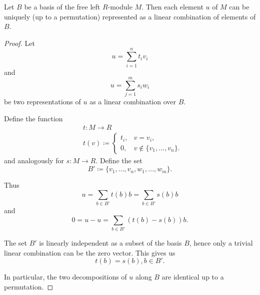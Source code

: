 \begin{proposition}\label{def:left_module_basis_decomposition}
  Let \( B \) be a basis of the free left \( R \)-module \( M \). Then each element \( u \) of \( M \) can be uniquely (up to a permutation) represented as a linear combination of elements of \( B \).
\end{proposition}
\begin{proof}
  Let
  \begin{equation*}
    u = \sum_{i=1}^n t_i v_i
  \end{equation*}
  and
  \begin{equation*}
    u = \sum_{j=1}^m s_i w_i
  \end{equation*}
  be two representations of \( u \) as a linear combination over \( B \).

  Define the function
  \begin{align*}
    &t: M \to R \\
    &t(v) \coloneqq \begin{cases}
      t_i, &v = v_i, \\
      0, &v \not\in \{ v_1, \ldots, v_n \}.
    \end{cases}
  \end{align*}
  and analogously for \( s: M \to R \). Define the set
  \begin{equation*}
    B' \coloneqq \{ v_1, \ldots, v_n, w_1, \ldots, w_m \}.
  \end{equation*}

  Thus
  \begin{equation*}
    u = \sum_{b \in B'} t(b) b = \sum_{b \in B'} s(b) b
  \end{equation*}
  and
  \begin{equation*}
    0 = u - u = \sum_{b \in B'} (t(b) - s(b)) b.
  \end{equation*}

  The set \( B' \) is linearly independent as a subset of the basis \( B \), hence only a trivial linear combination can be the zero vector. This gives us
  \begin{equation*}
    t(b) = s(b), b \in B'.
  \end{equation*}

  In particular, the two decompositions of \( u \) along \( B \) are identical up to a permutation.
\end{proof}

